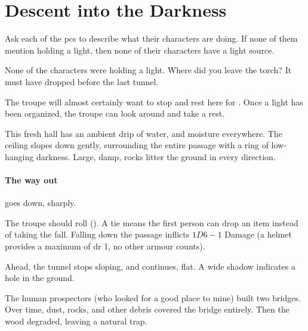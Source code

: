 \section{Descent into the Darkness}

\begin{multicols}{2}


Ask each of the \glspl{pc} to describe what their characters are doing.
If none of them mention holding a light, then none of their characters have a light source.

\begin{boxtext}
  None of the characters were holding a light.
  Where did you leave the torch?
  It must have dropped before the last tunnel.
\end{boxtext}

\noindent
The troupe will almost certainly want to stop and rest here for .
Once a light has been organized, the troupe can look around and take a rest.

\begin{boxtext}
  This fresh hall has an ambient drip of water, and moisture everywhere.
  The ceiling slopes down gently, surrounding the entire passage with a ring of low-hanging darkness.
  Large, damp, rocks litter the ground in every direction.
\end{boxtext}

\paragraph{The way out}
goes down, sharply.

The troupe should roll  (\tn[10]).
A tie means the first person can drop an item instead of taking the fall.
Falling down the passage inflicts $1D6-1$ Damage (a helmet provides a maximum of \gls{dr} 1, no other armour counts).

\begin{boxtext}
  Ahead, the tunnel stops sloping, and continues, flat.
  A wide shadow indicates a hole in the ground.
\end{boxtext}


\begin{exampletext}
  The human prospectors (who looked for a good place to mine) built two bridges.
  Over time, dust, rocks, and other debris covered the bridge entirely.
  Then the wood degraded, leaving a natural trap.


\end{exampletext}
\end{multicols}
